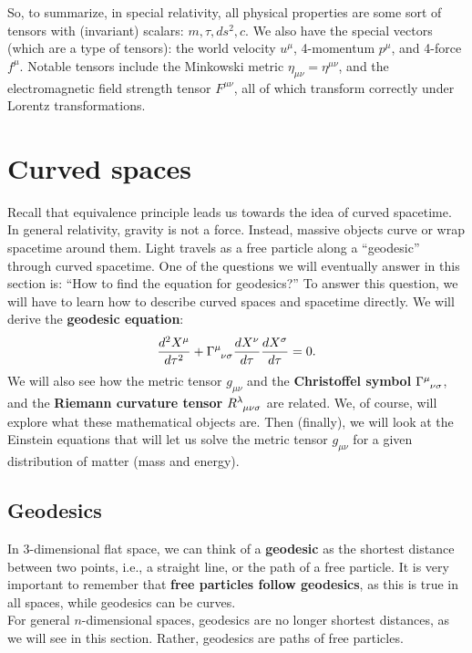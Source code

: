 \documentclass{book}
\theoremstyle{definition}
\begin{document}
So, to summarize, in special relativity, all physical properties are some sort of tensors with (invariant) scalars: $m, \tau, ds^2, c $. We also have the special vectors (which are a type of tensors): the world velocity $u^\mu$, 4-momentum $p^\mu$, and 4-force $f^\mu$. Notable tensors include the Minkowski metric $\eta_{\mu\nu} = \eta^{\mu\nu}$, and the electromagnetic field strength tensor $F^{\mu\nu}$, all of which transform correctly under Lorentz transformations.

\newpage

\chapter{Curved spaces}
Recall that equivalence principle leads us towards the idea of curved spacetime. In general relativity, gravity is not a force. Instead, massive objects curve or wrap spacetime around them. Light travels as a free particle along a ``geodesic'' through curved spacetime. One of the questions we will eventually answer in this section is: ``How to find the equation for geodesics?'' To answer this question, we will have to learn how to describe curved spaces and spacetime directly. We will derive the \textbf{geodesic equation}:
\begin{align*}
\frac{d^2X^\mu}{d\tau^2} + \tensor{\Gamma}{^\mu_{\nu\sigma}}\frac{dX^\nu}{d\tau}\frac{dX^\sigma}{d\tau} = 0.
\end{align*}
We will also see how the metric tensor $g_{\mu\nu}$ and the \textbf{Christoffel symbol} $\tensor{\Gamma}{^\mu_{\nu\sigma}}$, and the \textbf{Riemann curvature tensor} $\tensor{R}{^\lambda_{\mu\nu\sigma}}$ are related. We, of course, will explore what these mathematical objects are. Then (finally), we will look at the Einstein equations that will let us solve the metric tensor $g_{\mu\nu}$ for a given distribution of matter (mass and energy). 
\section{Geodesics}
In 3-dimensional flat space, we can think of a \textbf{geodesic} as the shortest distance between two points, i.e., a straight line, or the path of a free particle. It is very important to remember that \textbf{free particles follow geodesics}, as this is true in all spaces, while geodesics can be curves.\\

For general $n$-dimensional spaces, geodesics are no longer shortest distances, as we will see in this section. Rather, geodesics are paths of free particles. \\
\end{document}
